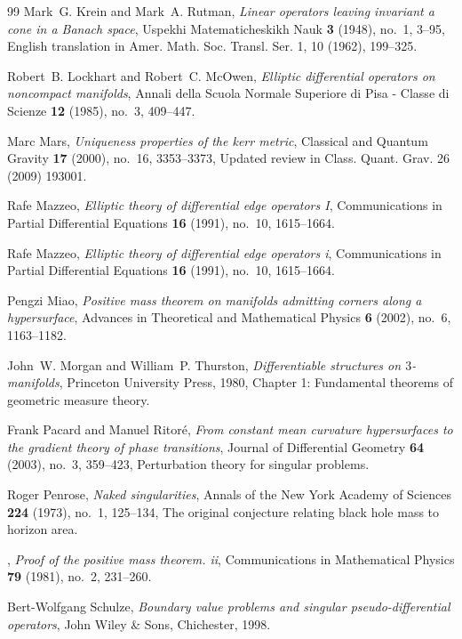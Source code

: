 \begin{thebibliography}{99}
Mark~G. Krein and Mark~A. Rutman, \emph{Linear operators leaving invariant a cone in a Banach space}, Uspekhi Matematicheskikh Nauk \textbf{3} (1948), no.~1, 3--95, English translation in Amer. Math. Soc. Transl. Ser. 1, 10 (1962), 199--325.

Robert~B. Lockhart and Robert~C. McOwen, \emph{Elliptic differential operators
  on noncompact manifolds}, Annali della Scuola Normale Superiore di Pisa -
  Classe di Scienze \textbf{12} (1985), no.~3, 409--447.

Marc Mars, \emph{Uniqueness properties of the kerr metric}, Classical and
  Quantum Gravity \textbf{17} (2000), no.~16, 3353--3373, Updated review in
  Class. Quant. Grav. 26 (2009) 193001.

Rafe Mazzeo, \emph{Elliptic theory of differential edge operators I}, Communications in Partial Differential Equations \textbf{16} (1991), no.~10, 1615--1664.

Rafe Mazzeo, \emph{Elliptic theory of differential edge operators i},
  Communications in Partial Differential Equations \textbf{16} (1991), no.~10,
  1615--1664.

Pengzi Miao, \emph{Positive mass theorem on manifolds admitting corners along a
  hypersurface}, Advances in Theoretical and Mathematical Physics \textbf{6}
  (2002), no.~6, 1163--1182.

John~W. Morgan and William~P. Thurston, \emph{Differentiable structures on $3$-manifolds}, Princeton University Press, 1980, Chapter 1: Fundamental theorems of geometric measure theory.

Frank Pacard and Manuel Ritor\'e, \emph{From constant mean curvature
  hypersurfaces to the gradient theory of phase transitions}, Journal of
  Differential Geometry \textbf{64} (2003), no.~3, 359--423, Perturbation
  theory for singular problems.

Roger Penrose, \emph{Naked singularities}, Annals of the New York Academy of
  Sciences \textbf{224} (1973), no.~1, 125--134, The original conjecture
  relating black hole mass to horizon area.

\bysame, \emph{Proof of the positive mass theorem. ii}, Communications in
  Mathematical Physics \textbf{79} (1981), no.~2, 231--260.

Bert-Wolfgang Schulze, \emph{Boundary value problems and singular pseudo-differential operators}, John Wiley \& Sons, Chichester, 1998.


\end{thebibliography}
